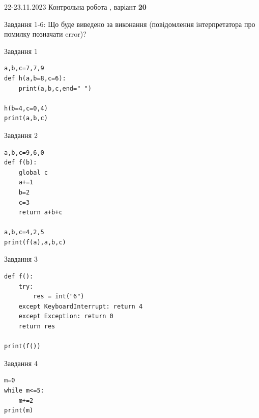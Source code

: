 \documentclass[12pt, ukrainian]{article}
\begin{document}
{{22-23.11.2023 Контрольна робота , варіант  \No \textbf { 20 }\par}}
{

Завдання 1-6: Що буде виведено за виконання (повідомлення інтерпретатора про помилку позначати error)?


\begin{minipage}[t]{9.7cm}                
{\begin{center}Завдання {1}\end{center}}
\begin{verbatim}
a,b,c=7,7,9
def h(a,b=8,c=6):
    print(a,b,c,end=" ")

h(b=4,c=0,4)
print(a,b,c)
\end{verbatim}     
\end{minipage}
\vline \hspace{8mm}
\begin{minipage}[t]{8.0cm}                
{\begin{center}Завдання {2}\end{center}}
\begin{verbatim}
a,b,c=9,6,0
def f(b):
    global c
    a+=1
    b=2
    c=3
    return a+b+c

a,b,c=4,2,5
print(f(a),a,b,c)
\end{verbatim}     
\end{minipage}

\vspace{15mm}
\begin{minipage}[t]{9.7cm}                
{\begin{center}Завдання {3}\end{center}}
\begin{verbatim}
def f():
    try:
        res = int("6")
    except KeyboardInterrupt: return 4
    except Exception: return 0
    return res

print(f())
\end{verbatim}     
\end{minipage}
\vline \hspace{8mm}
\begin{minipage}[t]{8.0cm}                
{\begin{center}Завдання {4}\end{center}}
\begin{verbatim}
m=0
while m<=5:
    m+=2
print(m)
\end{verbatim}     
\end{minipage}

}
\end{document}
